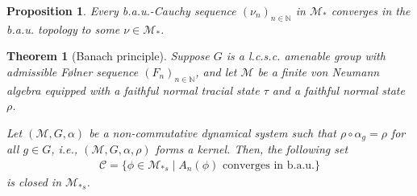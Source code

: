 \documentclass[10pt,a4paper]{amsart}
\newtheorem{prop}{Proposition}
\newtheorem{thm}{Theorem}
\newcommand{\CC}{\mathcal{C}}
\newcommand{\CM}{\mathcal{M}}
\def\N{\mathbb N}
\begin{document}
\begin{prop}\label{complete wrt bau-functionals}
	Every b.a.u.-Cauchy sequence $(\nu_n)_{n \in \N}$ in $\CM_*$ converges in the b.a.u. topology to some $\nu \in \CM_*$.
\end{prop}

    	\begin{thm}[Banach principle]\label{Banach principle}
		Suppose $G$ is a \textit{l.c.s.c.} amenable group with admissible F{\o}lner sequence $(F_{n})_{n \in \mathbb{N}}$, and let $\CM$ be a finite von Neumann algebra equipped with a faithful normal tracial state $\tau$ and a faithful normal state $\rho$. 
		
		Let $(\CM, G, \alpha)$ be a non-commutative dynamical system such that $\rho \circ \alpha_g = \rho$ for all $g \in G$, i.e., $(\CM, G, \alpha, \rho)$ forms a kernel. Then, the following set 
		\begin{align*}
			\CC = \{ \phi \in \CM_{*s} \mid A_n(\phi) \text{ converges in b.a.u.} \}
		\end{align*}
		is closed in $\CM_{*s}$.
	\end{thm}
\end{document}
